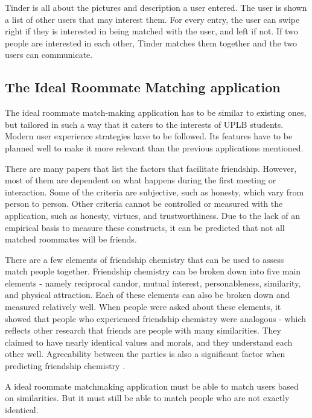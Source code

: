 \documentclass[journal]{./IEEE/IEEEtran}
\begin{document}
        Tinder is all about the pictures and description a user entered. The user is shown a list of other users that may
        interest them. For every entry, the user can swipe right if they is interested in being matched with the user, and left
        if not. If two people are interested in each other, Tinder matches them together and the two users can communicate.

    \subsection{The Ideal Roommate Matching application}
    The ideal roommate match-making application has to be similar to existing ones, but tailored in such a way that it
    caters to the interests of UPLB students. Modern user experience strategies have to be followed. Its features have
    to be planned well to make it more relevant than the previous applications mentioned.

    There are many papers that list the factors that facilitate friendship. However, most of them are dependent on what
    happens during the first meeting or interaction. Some of the criteria are subjective, such as honesty, which  vary
    from person to person. Other criteria cannot be controlled or measured with the application, such as honesty,
    virtues, and trustworthiness. Due to the lack of an empirical basis to measure these constructs, it can be predicted
    that not all matched roommates will be friends.

    There are a few elements of friendship chemistry that can be used to assess match people together. Friendship
    chemistry can be broken down into five main elements - namely reciprocal candor, mutual interest, personableness,
    similarity, and physical attraction\cite{f_chemistry}. Each of these elements can also be broken down and measured
    relatively well. When people were asked about these elements, it showed that people who experienced friendship
    chemistry were analogous\cite{f_chemistry} - which reflects other research that friends are people with many
    similarities\cite{similar}. They claimed to have nearly identical values and morals, and they understand each other
    well\cite{f_chemistry}. Agreeability between the parties is also a significant factor when predicting friendship
    chemistry \cite{f_chemistry}.

    A ideal roommate matchmaking application must be able to match users based on similarities. But it must still be
    able to match people who are not exactly identical.
\end{document}
